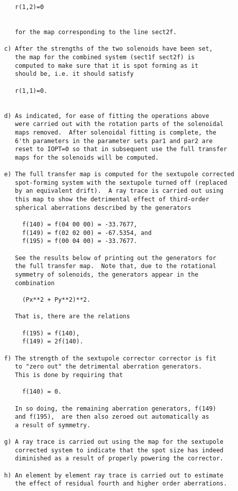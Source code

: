 \begin{footnotesize}
\begin{verbatim}
     r(1,2)=0


     for the map corresponding to the line sect2f.

  c) After the strengths of the two solenoids have been set,
     the map for the combined system (sect1f sect2f) is
     computed to make sure that it is spot forming as it
     should be, i.e. it should satisfy

     r(1,1)=0.


  d) As indicated, for ease of fitting the operations above
     were carried out with the rotation parts of the solenoidal
     maps removed.  After solenoidal fitting is complete, the
     6'th parameters in the parameter sets par1 and par2 are
     reset to IOPT=0 so that in subsequent use the full transfer
     maps for the solenoids will be computed.

  e) The full transfer map is computed for the sextupole corrected
     spot-forming system with the sextupole turned off (replaced
     by an equivalent drift).  A ray trace is carried out using
     this map to show the detrimental effect of third-order
     spherical aberrations described by the generators

       f(140) = f(04 00 00) = -33.7677,
       f(149) = f(02 02 00) = -67.5354, and
       f(195) = f(00 04 00) = -33.7677.

     See the results below of printing out the generators for
     the full transfer map.  Note that, due to the rotational
     symmetry of solenoids, the generators appear in the
     combination

       (Px**2 + Py**2)**2.

     That is, there are the relations

       f(195) = f(140),
       f(149) = 2f(140).

  f) The strength of the sextupole corrector corrector is fit
     to "zero out" the detrimental aberration generators.
     This is done by requiring that

       f(140) = 0.

     In so doing, the remaining aberration generators, f(149)
     and f(195),  are then also zeroed out automatically as
     a result of symmetry.

  g) A ray trace is carried out using the map for the sextupole
     corrected system to indicate that the spot size has indeed
     diminished as a result of properly powering the corrector.

  h) An element by element ray trace is carried out to estimate
     the effect of residual fourth and higher order aberrations.


\end{verbatim}
\end{footnotesize}
